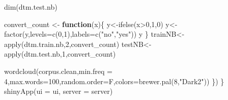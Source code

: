 \documentclass[
]{article}
\newenvironment{Shaded}{\begin{snugshade}}{\end{snugshade}}
\newcommand{\AttributeTok}[1]{\textcolor[rgb]{0.77,0.63,0.00}{#1}}
\newcommand{\ControlFlowTok}[1]{\textcolor[rgb]{0.13,0.29,0.53}{\textbf{#1}}}
\newcommand{\DecValTok}[1]{\textcolor[rgb]{0.00,0.00,0.81}{#1}}
\newcommand{\FunctionTok}[1]{\textcolor[rgb]{0.00,0.00,0.00}{#1}}
\newcommand{\NormalTok}[1]{#1}
\newcommand{\OtherTok}[1]{\textcolor[rgb]{0.56,0.35,0.01}{#1}}
\newcommand{\SpecialCharTok}[1]{\textcolor[rgb]{0.00,0.00,0.00}{#1}}
\newcommand{\StringTok}[1]{\textcolor[rgb]{0.31,0.60,0.02}{#1}}
\begin{document}
\begin{Shaded}
\begin{Highlighting}[]
\FunctionTok{dim}\NormalTok{(dtm.test.nb)}
 
\NormalTok{convert\_count }\OtherTok{\textless{}{-}} \ControlFlowTok{function}\NormalTok{(x)\{}
\NormalTok{    y}\OtherTok{\textless{}{-}}\FunctionTok{ifelse}\NormalTok{(x}\SpecialCharTok{\textgreater{}}\DecValTok{0}\NormalTok{,}\DecValTok{1}\NormalTok{,}\DecValTok{0}\NormalTok{)}
\NormalTok{    y}\OtherTok{\textless{}{-}}\FunctionTok{factor}\NormalTok{(y,}\AttributeTok{levels=}\FunctionTok{c}\NormalTok{(}\DecValTok{0}\NormalTok{,}\DecValTok{1}\NormalTok{),}\AttributeTok{labels=}\FunctionTok{c}\NormalTok{(}\StringTok{"no"}\NormalTok{,}\StringTok{"yes"}\NormalTok{))}
\NormalTok{    y}
\NormalTok{\}}
\NormalTok{trainNB}\OtherTok{\textless{}{-}}\FunctionTok{apply}\NormalTok{(dtm.train.nb,}\DecValTok{2}\NormalTok{,convert\_count)}
\NormalTok{testNB}\OtherTok{\textless{}{-}}\FunctionTok{apply}\NormalTok{(dtm.test.nb,}\DecValTok{1}\NormalTok{,convert\_count)}

\FunctionTok{wordcloud}\NormalTok{(corpus.clean,}\AttributeTok{min.freq =} \DecValTok{4}\NormalTok{,}\AttributeTok{max.words=}\DecValTok{100}\NormalTok{,}\AttributeTok{random.order=}\NormalTok{F,}\AttributeTok{colors=}\FunctionTok{brewer.pal}\NormalTok{(}\DecValTok{8}\NormalTok{,}\StringTok{"Dark2"}\NormalTok{))}
\NormalTok{  \})}
\NormalTok{\}}
\FunctionTok{shinyApp}\NormalTok{(}\AttributeTok{ui =}\NormalTok{ ui, }\AttributeTok{server =}\NormalTok{ server)}
\end{Highlighting}
\end{Shaded}
\end{document}
